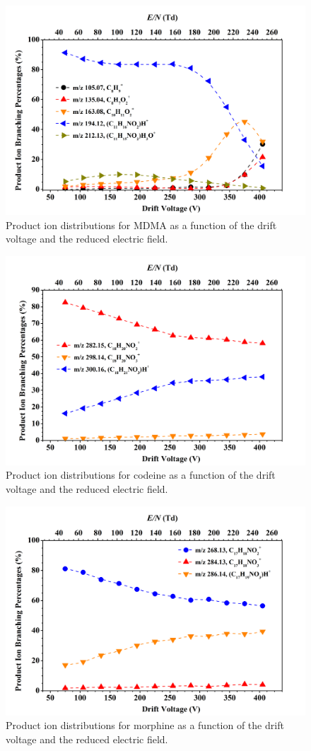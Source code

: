 \begin{figure}[htb]
\centering
\includegraphics[width=0.80\linewidth]{pics/other_drugs/mdmaBRud.png}
\caption{Product ion distributions for MDMA as a function of the drift voltage and the reduced electric field.}
\label{fig:DR_mdma}
\end{figure}


\begin{figure}[htb]
\centering
\includegraphics[width=0.80\linewidth]{pics/other_drugs/codeineBRud.png}
\caption{Product ion distributions for codeine as a function of the drift voltage and the reduced electric field.}
\label{fig:DR_codeine}
\end{figure}


\begin{figure}[htb]
\centering
\includegraphics[width=0.80\linewidth]{pics/other_drugs/morphineBRud.png}
\caption{Product ion distributions for morphine as a function of the drift voltage and the reduced electric field.}
\label{fig:DR_morphine}
\end{figure}



